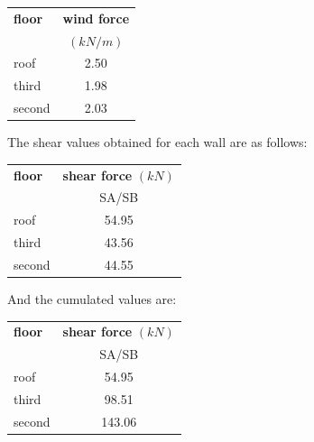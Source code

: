 \begin{center}
  \begin{tabular}{|l|c|}
    \hline
    \textbf{floor} & \textbf{wind force}\\
    & $(kN/m)$\\
    \hline
    roof & 2.50 \\
    third & 1.98 \\
    second & 2.03 \\
    \hline
  \end{tabular}
\end{center}  

\noindent The shear values obtained for each wall are as follows:

\begin{center}
  \begin{tabular}{|l|c|}
    \hline
    \textbf{floor} & \textbf{shear force} $(kN)$\\
                   & SA/SB \\
    \hline
    roof & 54.95 \\
    third & 43.56 \\
    second & 44.55 \\
    \hline
  \end{tabular}
\end{center}  

\noindent And the cumulated values are:

\begin{center}
  \begin{tabular}{|l|c|}
    \hline
    \textbf{floor} & \textbf{shear force} $(kN)$\\
                   & SA/SB \\
    \hline
    roof & 54.95 \\
    third & 98.51 \\
    second & 143.06 \\
    \hline
  \end{tabular}
\end{center}  

